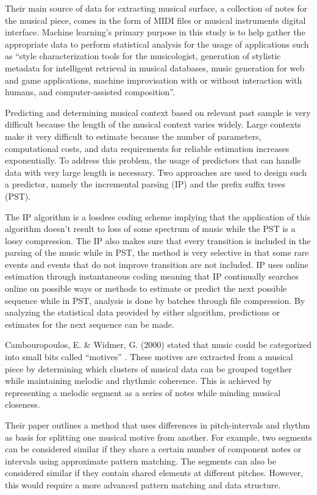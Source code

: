 Their main source of data for extracting musical surface, a collection of notes for the musical piece, comes in the form of MIDI files or musical instruments digital interface. Machine learning’s primary purpose in this study is to help gather the appropriate data to perform statistical analysis for the usage of applications such as “style characterization tools for the musicologist, generation of stylistic metadata for intelligent retrieval in musical databases, music generation for web and game applications, machine improvisation with or without interaction with humans, and computer-assisted composition”.

Predicting and determining musical context based on relevant past sample is very difficult because the length of the musical context varies widely. Large contexts make it very difficult to estimate because the number of parameters, computational costs, and data requirements for reliable estimation increases exponentially. To address this problem, the usage of predictors that can handle data with very large length is necessary. Two approaches are used to design such a predictor, namely the incremental parsing (IP) and the prefix suffix trees (PST).

The IP algorithm is a lossless coding scheme implying that the application of this algorithm doesn’t result to loss of some spectrum of music while the PST is a lossy compression. The IP also makes sure that every transition is included in the parsing of the music while in PST, the method is very selective in that some rare events and events that do not improve transition are not included. IP uses online estimation through instantaneous coding meaning that IP continually searches online on possible ways or methods to estimate or predict the next possible sequence while in PST, analysis is done by batches through file compression. By analyzing the statistical data provided by either algorithm, predictions or estimates for the next sequence can be made.

Cambouropoulos, E. \& Widmer, G. (2000) stated that music could be categorized into small bits called ``motives'' . These motives are extracted from a musical piece by determining which clusters of musical data can be grouped together while maintaining melodic and rhythmic coherence. This is achieved by representing a melodic segment as a series of notes while minding musical closeness. 

Their paper outlines a method that uses differences in pitch-intervals and rhythm as basis for splitting one musical motive from another. For example, two segments can be considered similar if they share a certain number of component notes or intervals using approximate pattern matching. The segments can also be considered similar if they contain shared elements at different pitches. However, this would require a more advanced pattern matching and data structure.

